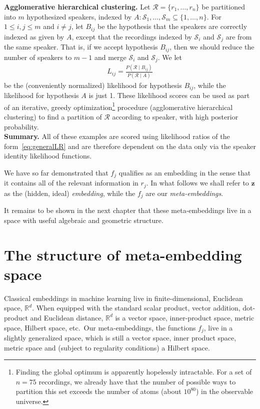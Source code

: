 \documentclass[a4paper,oneside,12pt,english]{report}
\def\zvec{\mathbf{z}}
\def\R{\mathbb{R}}
\def\Rset{\mathcal{R}}
\def\Sset{\mathcal{S}}
\begin{document}
\noindent\textbf{Agglomerative hierarchical clustering.} Let $\Rset=\{r_1,\ldots,r_n\}$ be partitioned into $m$ hypothesized speakers, indexed by $A:\Sset_1,\ldots,\Sset_m\subseteq\{1,\ldots,n\}$. For $1\le i,j\le m$ and $i\ne j$, let $B_{ij}$ be the hypothesis that the speakers are correctly indexed as given by $A$, except that the recordings indexed by $\Sset_i$ and $\Sset_j$ are from the same speaker. That is, if we accept hypothesis $B_{ij}$, then we should reduce the number of speakers to $m-1$ and merge $\Sset_i$ and $\Sset_j$. We let 
\begin{align}
\label{eq:LR_AHC}
L_{ij}=\frac{P(\Rset\mid B_{ij})}{P(\Rset\mid A)}
\end{align}
be the (conveniently normalized) likelihood for hypothesis $B_{ij}$,  while the likelihood for hypothesis $A$ is just 1. These likelihood scores can be used as part of an iterative, greedy optimization\footnote{Finding the global optimum is apparently hopelessly intractable. For a set of $n=75$ recordings, we already have that the number of possible ways to partition this set exceeds the number of atoms (about $10^{80}$) in the observable universe.} procedure (agglomerative hierarchical clustering) to find a partition of $\Rset$ according to speaker, with high posterior probability. \\


\noindent
\textbf{Summary.} All of these examples are scored using likelihood ratios of the form~\eqref{eq:generalLR} and are therefore dependent on the data only via the speaker identity likelihood functions. 

We have so far demonstrated that $f_j$ qualifies as an embedding in the sense that it contains all of the relevant information in $r_j$. In what follows we shall refer to $\zvec$ as the (hidden, ideal) \emph{embedding}, while the $f_j$ are our \emph{meta-embeddings}. 

It remains to be shown in the next chapter that these meta-embeddings live in a space with useful algebraic and geometric structure.
	
	
\chapter{The structure of meta-embedding space}
Classical embeddings in machine learning live in finite-dimensional, Euclidean space, $\R^d$. When equipped with the standard scalar product, vector addition, dot-product and Euclidean distance, $\R^d$ is a vector space, inner-product space, metric space, Hilbert space, etc.\ Our meta-embeddings, the functions $f_j$, live in a slightly generalized space, which is still a vector space, inner product space, metric space and (subject to regularity conditions) a Hilbert space. 
\end{document}
